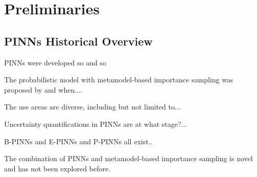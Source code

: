 \chapter{Preliminaries}
\label{ch:preliminaries}

\section{PINNs Historical Overview}
\label{sec:historical-overview}

PINNs were developed so and so 

The probabilistic model with metamodel-based importance sampling was proposed by and when....

The use areas are diverse, including but not limited to...

Uncertainty quantifications in PINNs are at what stage?...

B-PINNs and E-PINNs and P-PINNs all exist..

The combination of PINNs and metamodel-based importance sampling is novel and has not been explored before. 

